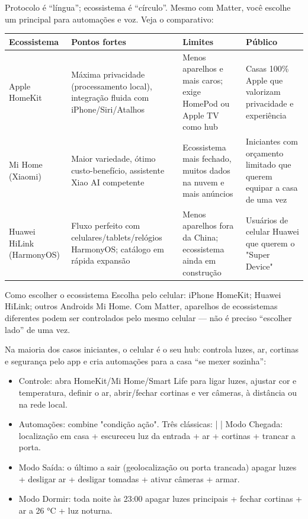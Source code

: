 
Protocolo é “língua”; ecossistema é “círculo”. Mesmo com Matter, você escolhe um principal para automações e voz. Veja o comparativo:

\begin{center}
\begin{tabularx}{\linewidth}{|X|X|X|X|}
\hline
\textbf{Ecossistema} & \textbf{Pontos fortes} & \textbf{Limites} & \textbf{Público} \tabularnewline
\hline
Apple HomeKit & Máxima privacidade (processamento local), integração fluida com iPhone/Siri/Atalhos & Menos aparelhos e mais caros; exige HomePod ou Apple TV como hub & Casas 100\% Apple que valorizam privacidade e experiência \tabularnewline
Mi Home (Xiaomi) & Maior variedade, ótimo custo-benefício, assistente Xiao AI competente & Ecossistema mais fechado, muitos dados na nuvem e mais anúncios & Iniciantes com orçamento limitado que querem equipar a casa de uma vez \tabularnewline
Huawei HiLink (HarmonyOS) & Fluxo perfeito com celulares/tablets/relógios HarmonyOS; catálogo em rápida expansão & Menos aparelhos fora da China; ecossistema ainda em construção & Usuários de celular Huawei que querem o "Super Device" \tabularnewline
\hline
\end{tabularx}
\end{center}

\begin{tcbinfo}{Como escolher o ecossistema}
Escolha pelo celular: iPhone HomeKit; Huawei HiLink; outros Androids Mi Home. Com Matter, aparelhos de ecossistemas diferentes podem ser controlados pelo mesmo celular — não é preciso “escolher lado” de uma vez.

\end{tcbinfo}


Na maioria dos casos iniciantes, o celular é o seu hub: controla luzes, ar, cortinas e segurança pelo app e cria automações para a casa “se mexer sozinha”:

\begin{itemize}
  \item Controle: abra HomeKit/Mi Home/Smart Life para ligar luzes, ajustar cor e temperatura, definir o ar, abrir/fechar cortinas e ver câmeras, à distância ou na rede local.
  \item Automações: combine "condição ação". Três clássicas: | | Modo Chegada: localização em casa + escureceu luz da entrada + ar + cortinas + trancar a porta.
  \item Modo Saída: o último a sair (geolocalização ou porta trancada) apagar luzes + desligar ar + desligar tomadas + ativar câmeras + armar.
  \item Modo Dormir: toda noite às 23:00 apagar luzes principais + fechar cortinas + ar a 26 °C + luz noturna.
\end{itemize}

